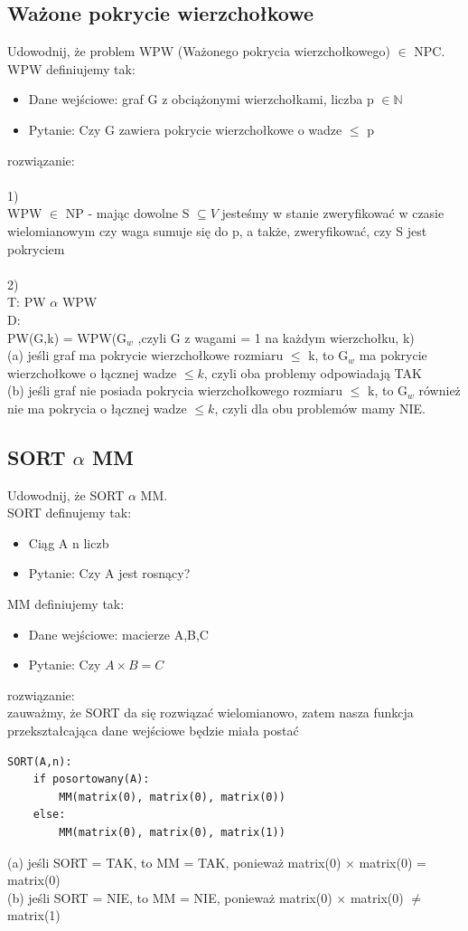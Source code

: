\documentclass{article}
\begin{document}
\subsection*{Ważone pokrycie wierzchołkowe}
Udowodnij, że problem WPW (Ważonego pokrycia wierzchołkowego) $\in$ NPC. WPW definiujemy tak:
\begin{itemize}
	\item Dane wejściowe: graf G z obciążonymi wierzchołkami, liczba p $\in \mathbb{N}$
	\item Pytanie: Czy G zawiera pokrycie wierzchołkowe o wadze $\leq$ p
\end{itemize}
rozwiązanie:\\\\
1)\\
WPW $\in$ NP - mając dowolne S $\subseteq V$ jesteśmy w stanie zweryfikować w czasie wielomianowym czy waga sumuje się do p, a także, 
zweryfikować, czy S jest pokryciem \\\\
2)\\
T: PW $\alpha$ WPW \\
D: \\
PW(G,k) = WPW(G$_w$ ,czyli G z wagami = 1 na każdym wierzchołku, k) \\
(a) jeśli graf ma pokrycie wierzchołkowe rozmiaru $\leq $ k, to G$_w$ ma pokrycie wierzchołkowe o łącznej wadze $\leq k$, 
czyli oba problemy odpowiadają TAK \\
(b) jeśli graf nie posiada pokrycia wierzchołkowego rozmiaru $\leq$ k, to G$_w$ również nie ma pokrycia o łącznej wadze $\leq k$, 
czyli dla obu problemów mamy NIE.

\subsection*{SORT $\alpha$ MM}
Udowodnij, że SORT $\alpha$ MM. \\ 
SORT definujemy tak:
\begin{itemize}
	\item Ciąg A n liczb
	\item Pytanie: Czy A jest rosnący?
\end{itemize}
MM definiujemy tak:
\begin{itemize}
	\item Dane wejściowe: macierze A,B,C
	\item Pytanie: Czy $A \times B = C$
\end{itemize}
rozwiązanie: \\
zauważmy, że SORT da się rozwiązać wielomianowo, zatem nasza funkcja przekształcająca dane wejściowe będzie miała postać
\begin{lstlisting}
SORT(A,n):
	if posortowany(A):
		MM(matrix(0), matrix(0), matrix(0))
	else:
		MM(matrix(0), matrix(0), matrix(1))
\end{lstlisting}
(a) jeśli SORT = TAK, to MM = TAK, ponieważ matrix(0) $\times$ matrix(0) = matrix(0) \\
(b) jeśli SORT = NIE, to MM = NIE, ponieważ matrix(0) $\times$ matrix(0) $\ne$ matrix(1)
\end{document}
